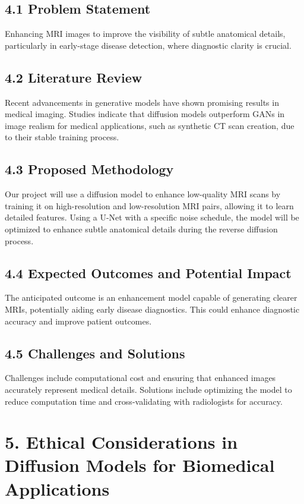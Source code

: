 \documentclass[12pt]{article}
\begin{document}
\subsection*{4.1 Problem Statement}
Enhancing MRI images to improve the visibility of subtle anatomical details, particularly in early-stage disease detection, where diagnostic clarity is crucial.

\subsection*{4.2 Literature Review}
Recent advancements in generative models have shown promising results in medical imaging. Studies indicate that diffusion models outperform GANs in image realism for medical applications, such as synthetic CT scan creation, due to their stable training process.

\subsection*{4.3 Proposed Methodology}
Our project will use a diffusion model to enhance low-quality MRI scans by training it on high-resolution and low-resolution MRI pairs, allowing it to learn detailed features. Using a U-Net with a specific noise schedule, the model will be optimized to enhance subtle anatomical details during the reverse diffusion process.

\subsection*{4.4 Expected Outcomes and Potential Impact}
The anticipated outcome is an enhancement model capable of generating clearer MRIs, potentially aiding early disease diagnostics. This could enhance diagnostic accuracy and improve patient outcomes.

\subsection*{4.5 Challenges and Solutions}
Challenges include computational cost and ensuring that enhanced images accurately represent medical details. Solutions include optimizing the model to reduce computation time and cross-validating with radiologists for accuracy.

\section*{5. Ethical Considerations in Diffusion Models for Biomedical Applications}
\end{document}
